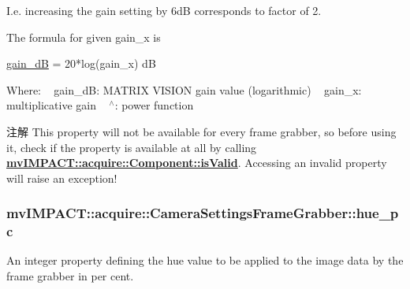 I.\+e. increasing the gain setting by 6d\+B corresponds to factor of 2.

The formula for given gain\+\_\+x is 
\begin{DoxyCode}
\hyperlink{classmv_i_m_p_a_c_t_1_1acquire_1_1_camera_settings_frame_grabber_a53d9afd1f0e37c6af77840ee59e71dc2}{gain\_dB} = 20*log(gain\_x) dB
\end{DoxyCode}


Where\+: ~\newline
{\ttfamily gain\+\_\+d\+B\+:} M\+A\+T\+R\+I\+X V\+I\+S\+I\+O\+N gain value (logarithmic) ~\newline
{\ttfamily gain\+\_\+x\+:} multiplicative gain ~\newline
{\ttfamily $^\wedge$}\+: power function ~\newline
 \begin{DoxyNote}{注解}
This property will not be available for every frame grabber, so before using it, check if the property is available at all by calling {\bfseries \hyperlink{classmv_i_m_p_a_c_t_1_1acquire_1_1_component_ac51e55e7e046101f3c6119d84123abd5}{mv\+I\+M\+P\+A\+C\+T\+::acquire\+::\+Component\+::is\+Valid}}. Accessing an invalid property will raise an exception! 
\end{DoxyNote}
\hypertarget{classmv_i_m_p_a_c_t_1_1acquire_1_1_camera_settings_frame_grabber_ac6086e7d04fa208f43c0d146de499714}{
\subsubsection[{hue\+\_\+pc}]{ mv\+I\+M\+P\+A\+C\+T\+::acquire\+::\+Camera\+Settings\+Frame\+Grabber\+::hue\+\_\+pc}}\label{classmv_i_m_p_a_c_t_1_1acquire_1_1_camera_settings_frame_grabber_ac6086e7d04fa208f43c0d146de499714}


An integer property defining the hue value to be applied to the image data by the frame grabber in per cent. 

